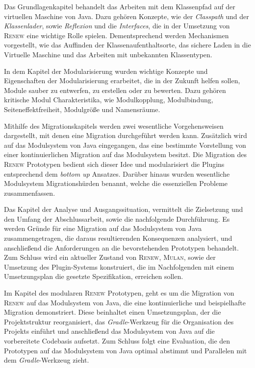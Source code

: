 Das Grundlagenkapitel behandelt das Arbeiten mit dem Klassenpfad auf der virtuellen Maschine von Java. Dazu gehören Konzepte, wie der \textit{Classpath} und der \textit{Klassenlader}, sowie \textit{Reflexion} und die \textit{Interfaces}, die in der Umsetzung von \textsc{Renew} eine wichtige Rolle spielen. Dementsprechend werden Mechanismen vorgestellt, wie das Auffinden der Klassenaufenthaltsorte, das sichere Laden in die Virtuelle Maschine und das Arbeiten mit unbekannten Klassentypen.\bigbreak

In dem Kapitel der Modularisierung wurden wichtige Konzepte und Eigenschaften der Modularisierung erarbeitet, die in der Zukunft helfen sollen, Module sauber zu entwerfen, zu erstellen oder zu bewerten. Dazu gehören kritische Modul Charakteristika, wie Modulkopplung, Modulbindung, Seiteneffektfreiheit, Modulgröße und Namensräume. \bigbreak

Mithilfe des Migrationskapitels werden zwei wesentliche Vorgehensweisen dargestellt, mit denen eine Migration durchgeführt werden kann. Zusätzlich wird auf das Modulsystem von Java eingegangen, das eine bestimmte Vorstellung von einer kontinuierlichen Migration auf das Modulsystem besitzt. \newline
Die Migration des \textsc{Renew} Prototypen bedient sich dieser Idee und modularisiert die Plugins entsprechend dem \textit{bottom up} Ansatzes. Darüber hinaus wurden wesentliche Modulsystem Migrationshürden benannt, welche die essenziellen Probleme zusammenfassen. \bigbreak

Das Kapitel der Analyse und Ausgangssituation, vermittelt die Zielsetzung und den Umfang der Abschlussarbeit, sowie die nachfolgende Durchführung. Es werden Gründe für eine Migration auf das Modulsystem von Java zusammengetragen, die daraus resultierenden Konsequenzen analysiert, und anschließend die Anforderungen an die bevorstehenden Prototypen behandelt. Zum Schluss wird ein aktueller Zustand von \textsc{Renew}, \textsc{Mulan}, sowie der Umsetzung des Plugin-Systems konstruiert, die im Nachfolgenden mit einem Umsetzungsplan die gesetzte Spezifikation, erreichen sollen.\bigbreak

Im Kapitel des modularen \textsc{Renew} Prototypen, geht es um die Migration von \textsc{Renew} auf das Modulsystem von Java, die eine kontinuierliche und beispielhafte Migration demonstriert. Diese beinhaltet einen Umsetzungsplan, der die Projektstruktur reorganisiert, das \textit{Gradle}-Werkzeug für die Organisation des Projekts einführt und anschließend das Modulsystem von Java auf die vorbereitete Codebasis aufsetzt. Zum Schluss folgt eine Evaluation, die den Prototypen auf das Modulsystem von Java optimal abstimmt und Parallelen mit dem \textit{Gradle}-Werkzeug zieht.\bigbreak


